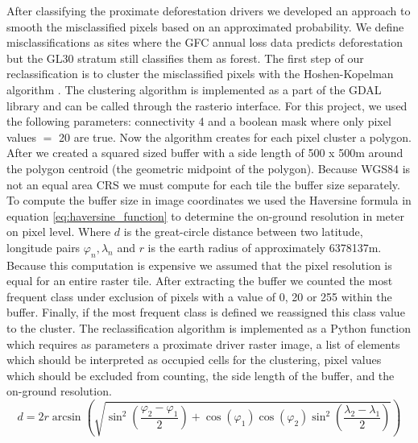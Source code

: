 			After classifying the proximate deforestation drivers we developed an approach to smooth the misclassified pixels based on an approximated probability. We define misclassifications as sites where the \ac{GFC} annual loss data predicts deforestation but the \ac{GL30} stratum still classifies them as forest. The first step of our reclassification is to cluster the misclassified pixels with the Hoshen-Kopelman algorithm \citep{Hoshen1998}. The clustering algorithm is implemented as a part of the \ac{GDAL} library and can be called through the rasterio interface. For this project, we used the following parameters: connectivity 4 and a boolean mask where only pixel values $=$ 20 are true. Now the algorithm creates for each pixel cluster a polygon. After we created a squared sized buffer with a side length of 500 x 500m around the polygon centroid (the geometric midpoint of the polygon). Because \ac{WGS84} is not an equal area \ac{CRS} we must compute for each tile the buffer size separately. To compute the buffer size in image coordinates we used the Haversine formula in equation \ref{eq:haversine_function} to determine the on-ground resolution in meter on pixel level. Where $d$ is the great-circle distance between two latitude, longitude pairs $\varphi_n, \lambda_n$ and $r$ is the earth radius of approximately 6378137m. Because this computation is expensive we assumed that the pixel resolution is equal for an entire raster tile. After extracting the buffer we counted the most frequent class under exclusion of pixels with a value of 0, 20 or 255 within the buffer. Finally, if the most frequent class is defined we reassigned this class value to the cluster. The reclassification algorithm is implemented as a Python function which requires as parameters a proximate driver raster image, a list of elements which should be interpreted as occupied cells for the clustering, pixel values which should be excluded from counting, the side length of the buffer, and the on-ground resolution. 
			\begin{equation}
			\label{eq:haversine_function}
				d = 2r\arcsin\left(
				\sqrt{
						\sin^2\left(\frac{\varphi_2-\varphi_1}{2}\right)+\cos\left(\varphi_1\right)\cos\left(\varphi_2\right)\sin^2\left(\frac{\lambda_2-\lambda_1}{2}\right)
				}
				\right)
			\end{equation}

